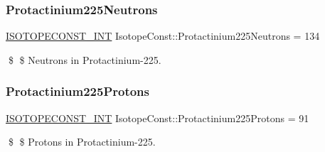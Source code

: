 \subsubsection{\texorpdfstring{Protactinium225\+Neutrons}{Protactinium225Neutrons}}
{\footnotesize\ttfamily \mbox{\hyperlink{group___isotope_const-_macros_ga5f18360b3e99483a35c32d789e62621c}{I\+S\+O\+T\+O\+P\+E\+C\+O\+N\+S\+T\+\_\+\+I\+NT}} Isotope\+Const\+::\+Protactinium225\+Neutrons = 134}

\$ \$ Neutrons in Protactinium-\/225. \mbox{\label{group___isotope_const-_protactinium-_pa225_gaaa4a3070fa82cb892bbdaaa48b097d33}} 
\subsubsection{\texorpdfstring{Protactinium225\+Protons}{Protactinium225Protons}}
{\footnotesize\ttfamily \mbox{\hyperlink{group___isotope_const-_macros_ga5f18360b3e99483a35c32d789e62621c}{I\+S\+O\+T\+O\+P\+E\+C\+O\+N\+S\+T\+\_\+\+I\+NT}} Isotope\+Const\+::\+Protactinium225\+Protons = 91}

\$ \$ Protons in Protactinium-\/225. 